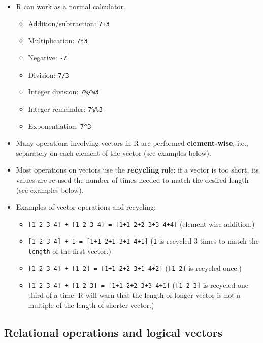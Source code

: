 \documentclass[
]{book}
\providecommand{\tightlist}{%
  \setlength{\itemsep}{0pt}\setlength{\parskip}{0pt}}
\begin{document}
\begin{itemize}
\tightlist
\item
  R can work as a normal calculator.

  \begin{itemize}
  \tightlist
  \item
    Addition/subtraction: \texttt{7+3}
  \item
    Multiplication: \texttt{7*3}
  \item
    Negative: \texttt{-7}
  \item
    Division: \texttt{7/3}
  \item
    Integer division: \texttt{7\%/\%3}
  \item
    Integer remainder: \texttt{7\%\%3}
  \item
    Exponentiation: \texttt{7\^{}3}
  \end{itemize}
\item
  Many operations involving vectors in R are performed \textbf{element-wise}, i.e., separately on each element of the vector (see examples below).
\item
  Most operations on vectors use the \textbf{recycling} rule: if a vector is too short, its values are re-used the number of times needed to match the desired length (see examples below).
\item
  Examples of vector operations and recycling:

  \begin{itemize}
  \tightlist
  \item
    \texttt{{[}1\ 2\ 3\ 4{]}\ +\ {[}1\ 2\ 3\ 4{]}\ =\ {[}1+1\ 2+2\ 3+3\ 4+4{]}} (element-wise addition.)
  \item
    \texttt{{[}1\ 2\ 3\ 4{]}\ +\ 1\ =\ {[}1+1\ 2+1\ 3+1\ 4+1{]}} (\texttt{1} is recycled 3 times to match the \texttt{length} of the first vector.)
  \item
    \texttt{{[}1\ 2\ 3\ 4{]}\ +\ {[}1\ 2{]}\ =\ {[}1+1\ 2+2\ 3+1\ 4+2{]}} (\texttt{{[}1\ 2{]}} is recycled once.)
  \item
    \texttt{{[}1\ 2\ 3\ 4{]}\ +\ {[}1\ 2\ 3{]}\ =\ {[}1+1\ 2+2\ 3+3\ 4+1{]}} (\texttt{{[}1\ 2\ 3{]}} is recycled one third of a time: R will warn that the length of longer vector is not a multiple of the length of shorter vector.)
  \end{itemize}
\end{itemize}

\hypertarget{relational-operations-and-logical-vectors}{%
\subsection{Relational operations and logical vectors}\label{relational-operations-and-logical-vectors}}
\end{document}
